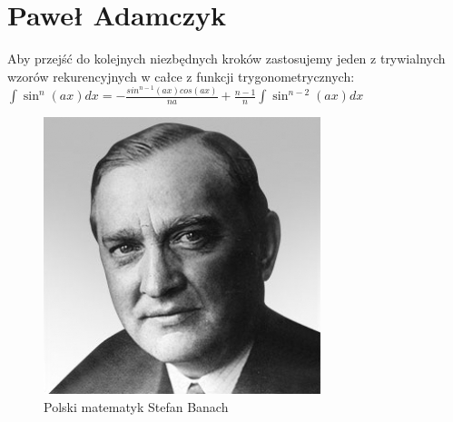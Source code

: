 \section{Paweł Adamczyk}
\label{sec:adpawel}

Aby przejść do kolejnych niezbędnych kroków zastosujemy jeden z trywialnych wzorów rekurencyjnych w całce z funkcji trygonometrycznych:\\ 
$\int\sin^n(ax)dx = -\frac{sin^{n-1}(ax)cos(ax)}{na}+\frac{n-1}{n}\int\sin^{n-2}(ax)dx$

\begin{figure}[htbp]
  \centering
  \includegraphics[width=0.7\linewidth]{pictures/banach.jpg}
  \caption{Polski matematyk Stefan Banach}
  \label{fig:banach}
\end{figure}


